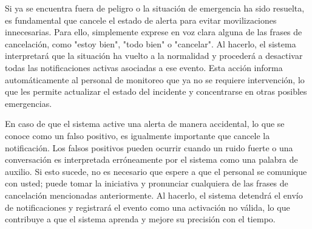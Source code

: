 Si ya se encuentra fuera de peligro o la situación de emergencia ha sido resuelta, es fundamental que cancele el estado de alerta para evitar movilizaciones innecesarias. Para ello, simplemente exprese en voz clara alguna de las frases de cancelación, como "estoy bien", "todo bien" o "cancelar". Al hacerlo, el sistema interpretará que la situación ha vuelto a la normalidad y procederá a desactivar todas las notificaciones activas asociadas a ese evento. Esta acción informa automáticamente al personal de monitoreo que ya no se requiere intervención, lo que les permite actualizar el estado del incidente y concentrarse en otras posibles emergencias.

En caso de que el sistema active una alerta de manera accidental, lo que se conoce como un falso positivo, es igualmente importante que cancele la notificación. Los falsos positivos pueden ocurrir cuando un ruido fuerte o una conversación es interpretada erróneamente por el sistema como una palabra de auxilio. Si esto sucede, no es necesario que espere a que el personal se comunique con usted; puede tomar la iniciativa y pronunciar cualquiera de las frases de cancelación mencionadas anteriormente. Al hacerlo, el sistema detendrá el envío de notificaciones y registrará el evento como una activación no válida, lo que contribuye a que el sistema aprenda y mejore su precisión con el tiempo.
